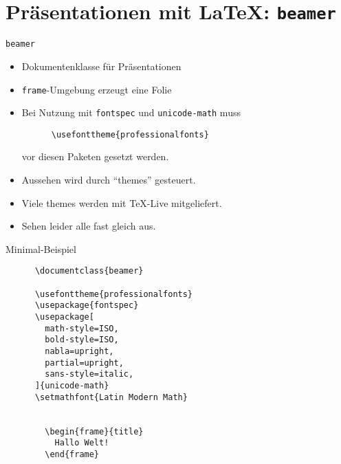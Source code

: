 \section{Präsentationen mit \LaTeX: \lstinline+beamer+}

\begin{frame}[fragile]{\lstinline+beamer+}
  \begin{itemize}
    \item Dokumentenklasse für Präsentationen
    \item \lstinline+frame+-Umgebung erzeugt eine Folie
    \item Bei Nutzung mit \lstinline+fontspec+ und \lstinline+unicode-math+ muss
      \begin{lstlisting}
      \usefonttheme{professionalfonts}
      \end{lstlisting}
      vor diesen Paketen gesetzt werden.
    \item Aussehen wird durch \enquote{themes} gesteuert.
    \item Viele themes werden mit \TeX-Live mitgeliefert.
    \item Sehen leider alle fast gleich aus.
  \end{itemize}
\end{frame}
\begin{frame}[fragile]{Minimal-Beispiel}
  \begin{center}
    \begin{lstlisting}
      \documentclass{beamer}

      \usefonttheme{professionalfonts}
      \usepackage{fontspec}
      \usepackage[
        math-style=ISO,
        bold-style=ISO,
        nabla=upright,
        partial=upright,
        sans-style=italic,
      ]{unicode-math}
      \setmathfont{Latin Modern Math}

      
        \begin{frame}{title}
          Hallo Welt!
        \end{frame}
      
    \end{lstlisting}
  \end{center}
\end{frame}
